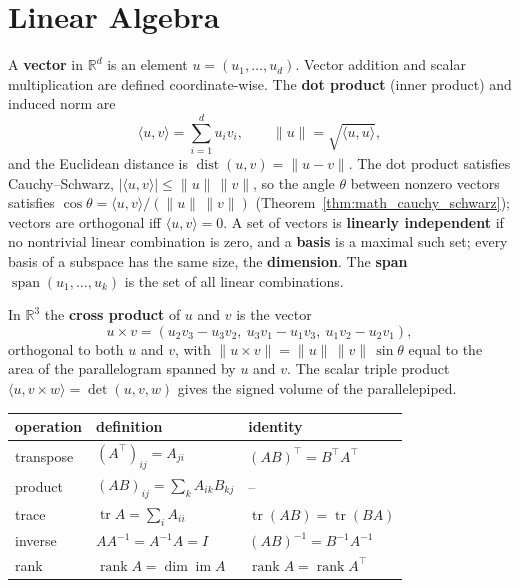 \section{Linear Algebra}
\label{sec:app_math_linear_algebra}

A \textbf{vector} in $\mathbb{R}^d$ is an element $u = (u_1,\dots,u_d)$.
Vector addition and scalar multiplication are defined coordinate-wise.
The \textbf{dot product} (inner product) and induced norm are
\[
  \langle u, v \rangle = \sum_{i=1}^d u_i v_i,
  \qquad
  \|u\| = \sqrt{\langle u, u \rangle},
\]
and the Euclidean distance is $\operatorname{dist}(u,v) = \|u - v\|$.
The dot product satisfies Cauchy--Schwarz,
$|\langle u,v\rangle| \le \|u\|\,\|v\|$, so the angle $\theta$ between
nonzero vectors satisfies $\cos\theta = \langle u,v\rangle / (\|u\|\,\|v\|)$
(Theorem~\ref{thm:math_cauchy_schwarz}); vectors are orthogonal iff
$\langle u,v\rangle = 0$. A set of vectors is \textbf{linearly independent}
if no nontrivial linear combination is zero, and a \textbf{basis} is a
maximal such set; every basis of a subspace has the same size, the
\textbf{dimension}. The \textbf{span}
$\operatorname{span}(u_1,\dots,u_k)$ is the set of all linear combinations.

In $\mathbb{R}^3$ the \textbf{cross product} of $u$ and $v$ is the vector
\[
  u \times v =
  (u_2 v_3 - u_3 v_2,\ u_3 v_1 - u_1 v_3,\ u_1 v_2 - u_2 v_1),
\]
orthogonal to both $u$ and $v$, with $\|u \times v\| = \|u\|\,\|v\|\,\sin\theta$
equal to the area of the parallelogram spanned by $u$ and $v$. The scalar
triple product $\langle u, v \times w \rangle = \det(u,v,w)$ gives the signed
volume of the parallelepiped.

\begin{center}
\begin{tabular}{lll}
\toprule
operation & definition & identity \\
\midrule
transpose & $(A^\top)_{ij} = A_{ji}$ & $(AB)^\top = B^\top A^\top$ \\
product & $(AB)_{ij} = \sum_k A_{ik} B_{kj}$ & -- \\
trace & $\operatorname{tr} A = \sum_i A_{ii}$ & $\operatorname{tr}(AB) = \operatorname{tr}(BA)$ \\
inverse & $A A^{-1} = A^{-1} A = I$ & $(AB)^{-1} = B^{-1} A^{-1}$ \\
rank & $\operatorname{rank} A = \dim \operatorname{im} A$ & $\operatorname{rank} A = \operatorname{rank} A^\top$ \\
\bottomrule
\end{tabular}
\end{center}

